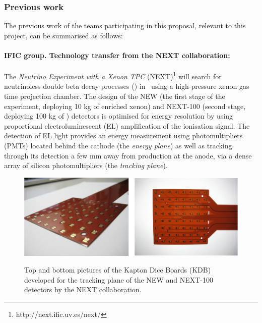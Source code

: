 \subsubsection*{Previous work }


The previous work of the teams participating in this proposal, relevant to this project, can be summarised as follows:

\paragraph{IFIC group. Technology transfer from the NEXT collaboration:}

The \emph{Neutrino Experiment with a Xenon TPC} (NEXT)\footnote{http://next.ific.uv.es/next/} will search for neutrinoless double beta decay processes (\bbonu) in \XE\ using a  high-pressure xenon gas time projection chamber. The design of the NEW (the first stage of the experiment, deploying 10 kg of enriched xenon) and NEXT-100 (second stage, deploying 100 kg of \XE) detectors is optimised for energy resolution by using proportional electroluminescent (EL) amplification of the ionisation signal. The detection of EL light provides an energy measurement using photomultipliers (PMTs) located behind the cathode (the \emph{energy plane}) as well as tracking through its detection a few mm away from production at the anode, via a dense array of silicon photomultipliers (the \emph{tracking plane}).

\begin{figure}[!htb]
	\centering
	\includegraphics[scale=0.5]{img/KDB2.png}\\
	\caption{\label{fig.KDB} Top and bottom pictures of the Kapton Dice Boards (KDB) developed for the tracking plane of the NEW and NEXT-100 detectors by the NEXT collaboration.}
\end{figure}

